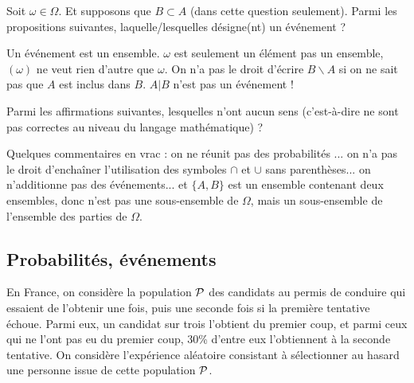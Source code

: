 \begin{question}
Soit $\omega\in\Omega$. Et supposons que $B\subset A$ (dans cette question seulement). Parmi les propositions suivantes, laquelle/lesquelles désigne(nt) un événement ?
\begin{answers}
\bad{$\omega$}
\good{$\{\omega\}$}
\bad{$(\omega)$}
\end{answers}
\begin{explanations}
Un événement est un ensemble. $\omega$ est seulement un élément pas un ensemble, $(\omega)$ ne veut rien d'autre que $\omega$. 
On n'a pas le droit d'écrire $B\backslash A$ si on ne sait pas que $A$ est inclus dans $B$.
$A|B$ n'est pas un événement ! 
\end{explanations}
\end{question}


\begin{question}
Parmi les affirmations suivantes, lesquelles n'ont aucun sens (c'est-à-dire ne sont pas correctes au niveau du langage mathématique) ? 
\begin{answers}
\end{answers}
\begin{explanations}
Quelques commentaires en vrac : on ne réunit pas des probabilités ... on n'a pas le droit d'enchaîner l'utilisation des symboles $\cap$ et $\cup$ sans parenthèses... on n'additionne pas des événements... et $\{ A,B\}$ est un ensemble contenant deux ensembles, donc n'est pas une sous-ensemble de $\Omega$, mais un sous-ensemble de l'ensemble des parties de $\Omega$.  
\end{explanations}
\end{question}



\subsection{Probabilités, événements}


En France, on considère la population ${\cal P}$ des candidats au permis de conduire qui essaient de l'obtenir une fois, puis une seconde fois si la première tentative échoue. Parmi eux, un candidat sur trois l'obtient du premier coup, et parmi ceux qui ne l'ont pas eu du premier coup, 30\% d'entre eux l'obtiennent à la seconde tentative.
On considère l'expérience aléatoire consistant à sélectionner au hasard une personne issue de cette population ${\cal P}$. 

